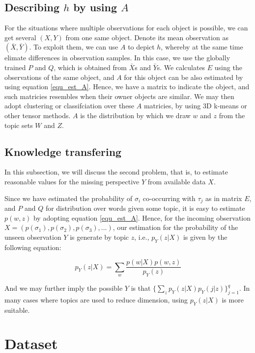 \documentclass[12pt,a4paper]{article}
\begin{document}
\begin{CJK*}{UTF8}{song}
\subsection{Describing $h$ by using $A$}
For the situations where multiple observations for each object is possible, we can get several $(X, Y)$ from one same object. Denote its mean observation as $(\bar{X}, \bar{Y})$. To exploit them, we can use $A$ to depict $h$, whereby at the same time elimate differences in observation samples. In this case, we use the globally trained $P$ and $Q$, which is obtained from $\bar{X}$s and $\bar{Y}$s. We calculates $E$ using the observations of the same object, and $A$ for this object can be also estimated by using equation \ref{equ_est_A}. Hence, we have a matrix to indicate the object, and such matricies resembles when their owner objects are similar. We may then adopt clustering or classifciation over these $A$ matricies, by using 3D k-means or other tensor methods. $A$ is the distribution by which we draw $w$ and $z$ from the topic sets $W$ and $Z$.

\subsection{Knowledge transfering}
In this subsection, we will discuss the second problem, that is, to estimate reasonable values for the missing perspective $Y$ from available data $X$.

Since we have estimated the probability of $\sigma_i$ co-occurring with $\tau_j$ as in matrix $E$, and $P$ and $Q$ for distribution over words given some topic, it is easy to estimate $p(w, z)$ by adopting equation \ref{equ_est_A}. Hence, for the incoming observation $X = (p(\sigma_1), p(\sigma_2), p(\sigma_3), ...)$, our estimation for the probability of the unseen observation $Y$ is generate by topic $z$, i.e., $p_Y(z|X)$ is given by the following equation:

\begin{equation}
p_Y(z|X) = \sum_w \frac{p(w|X)p(w, z)}{p_Y(z)}
\end{equation}

And we may further imply the possible $Y$ is that $\{\sum_z p_Y(z|X)p_Y(j|z)\}_{j=1}^q$. In many cases where topics are used to reduce dimension, using $p_Y(z|X)$ is more suitable.

\section{Dataset}

\end{CJK*}
\end{document}

